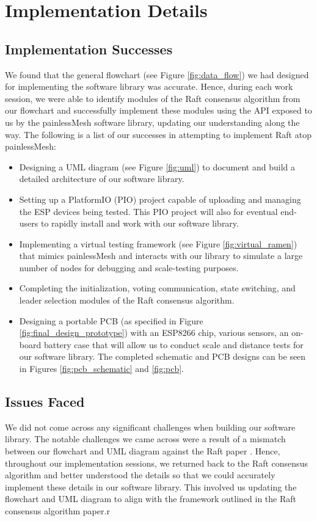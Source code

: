 \section{Implementation Details}

\subsection{Implementation Successes}
We found that the general flowchart (see Figure \ref{fig:data_flow}) we had designed for implementing the software library was accurate. Hence, during each work session, we were able to identify modules of the Raft consensus algorithm from our flowchart and successfully implement these modules using the API exposed to us by the painlessMesh software library, updating our understanding along the way. The following is a list of our successes in attempting to implement Raft atop painlessMesh:

\begin{itemize}
  \item Designing a UML diagram (see Figure \ref{fig:uml}) to document and build a detailed architecture of our software library.
  \item Setting up a PlatformIO (PIO) project capable of uploading and managing the ESP devices being tested. This PIO project will also for eventual end-users to rapidly install and work with our software library.
  \item Implementing a virtual testing framework (see Figure \ref{fig:virtual_ramen}) that mimics painlessMesh and interacts with our library to simulate a large number of nodes for debugging and scale-testing purposes.
  \item Completing the initialization, voting communication, state switching, and leader selection modules of the Raft consensus algorithm.
  \item Designing a portable PCB (as specified in Figure \ref{fig:final_design_prototype}) with an ESP8266 chip, various sensors, an on-board battery case that will allow us to conduct scale and distance tests for our software library. The completed schematic and PCB designs can be seen in Figures \ref{fig:pcb_schematic} and \ref{fig:pcb}.
\end{itemize}

\subsection{Issues Faced}
We did not come across any significant challenges when building our software library. The notable challenges we came across were a result of a mismatch between our flowchart and UML diagram against the Raft paper \cite{raft_paper}. Hence, throughout our implementation sessions, we returned back to the Raft consensus algorithm and better understood the details so that we could accurately implement these details in our software library. This involved us updating the flowchart and UML diagram to align with the framework outlined in the Raft consensus algorithm paper.r

